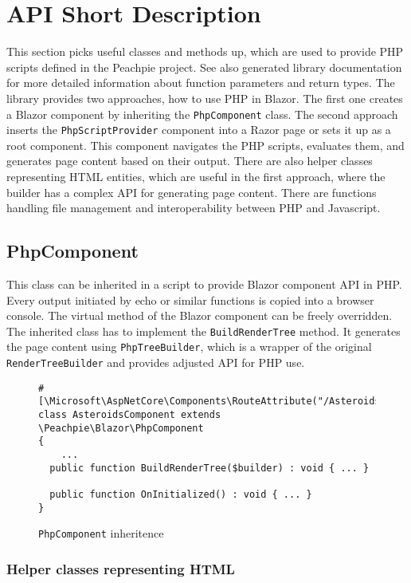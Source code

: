 \chapter{API Short Description}

This section picks useful classes and methods up, which are used to provide PHP scripts defined in the Peachpie project.
See also generated library documentation for more detailed information about function parameters and return types.
The library provides two approaches, how to use PHP in Blazor. 
The first one creates a Blazor component by inheriting the \texttt{PhpComponent} class. 
The second approach inserts the \texttt{PhpScriptProvider} component into a Razor page or sets it up as a root component. 
This component navigates the PHP scripts, evaluates them, and generates page content based on their output. 
There are also helper classes representing HTML entities, which are useful in the first approach, where the builder has a complex API for generating page content. There are functions handling file management and interoperability between PHP and Javascript.

\section{PhpComponent}

This class can be inherited in a script to provide Blazor component API in PHP. Every output initiated by echo or similar functions is copied into a browser console. The virtual method of the Blazor component can be freely overridden. The inherited class has to implement the \texttt{BuildRenderTree} method. It generates the page content using \texttt{PhpTreeBuilder}, which is a wrapper of the original \texttt{RenderTreeBuilder} and provides adjusted API for PHP use.
\par
\begin{figure}
\begin{lstlisting}
#[\Microsoft\AspNetCore\Components\RouteAttribute("/Asteroids")]
class AsteroidsComponent extends \Peachpie\Blazor\PhpComponent
{  
	...
  public function BuildRenderTree($builder) : void { ... }

  public function OnInitialized() : void { ... }
}
\end{lstlisting}
\caption{\texttt{PhpComponent} inheritence}
\label{img35:inheritance}
\end{figure}

\subsection{Helper classes representing HTML}

